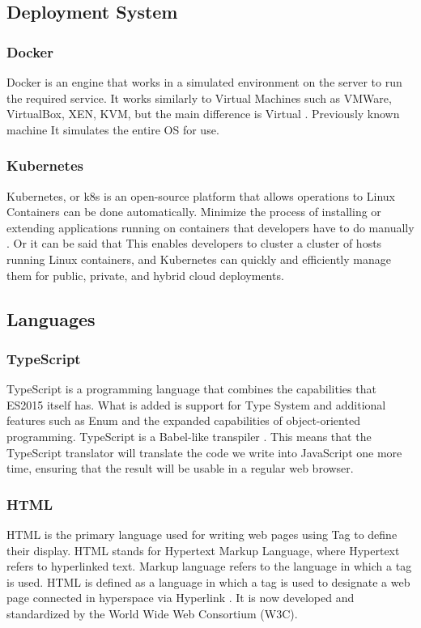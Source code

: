 \documentclass[12pt,oneside,openright,a4paper]{cpe-english-project}
\begin{document}
\subsection{Deployment System}
\subsubsection{Docker}
Docker is an engine that works in a simulated environment on the server to run the required service.
It works similarly to Virtual Machines such as VMWare, VirtualBox, XEN, KVM, but the main difference
is Virtual \cite{what_is_docker}. Previously known machine It simulates the entire OS for use.

\subsubsection{Kubernetes}
Kubernetes, or k8s is an open-source platform that allows operations to Linux Containers
can be done automatically. Minimize the process of installing or extending applications
running on containers that developers have to do manually \cite{explain_kubernetes}. Or
it can be said that This enables developers to cluster a cluster of hosts
running Linux containers, and Kubernetes can quickly and efficiently manage them
for public, private, and hybrid cloud deployments.

\subsection{Languages}
\subsubsection{TypeScript}
TypeScript is a programming language that combines the capabilities that ES2015 itself has.
What is added is support for Type System and additional features such as Enum and the expanded
capabilities of object-oriented programming. TypeScript is a Babel-like transpiler \cite{what_is_ts}.
This means that the TypeScript translator will translate the code we write into JavaScript one more
time, ensuring that the result will be usable in a regular web browser.

\subsubsection{HTML}
HTML is the primary language used for writing web pages using Tag to define their display.
HTML stands for Hypertext Markup Language, where Hypertext refers to hyperlinked text.
Markup language refers to the language in which a tag is used.
HTML is defined as a language in which a tag is used to designate a web page connected
in hyperspace via Hyperlink \cite{html_basic}. It is now developed and standardized by
the World Wide Web Consortium (W3C).
\end{document}
